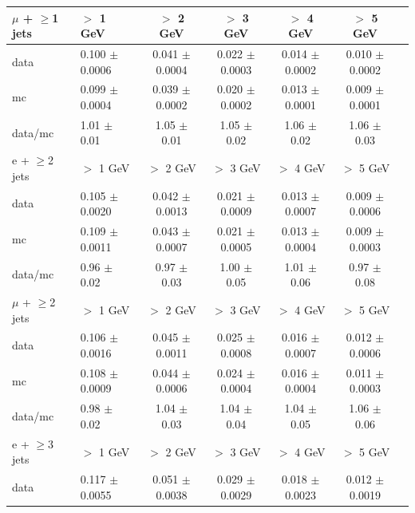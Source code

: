 \begin{table}[!ht]
\begin{center}
\begin{tabular}{l|l|c|c|c|c|c}
\hline
\hline
 $\mu$ + $\geq$1 jets            &           $>$ 1 GeV   &           $>$ 2 GeV   &           $>$ 3 GeV   &           $>$ 4 GeV   &           $>$ 5 GeV  \\
\hline
      data   &  0.100 $\pm$ 0.0006   &  0.041 $\pm$ 0.0004   &  0.022 $\pm$ 0.0003   &  0.014 $\pm$ 0.0002   &  0.010 $\pm$ 0.0002  \\
        mc   &  0.099 $\pm$ 0.0004   &  0.039 $\pm$ 0.0002   &  0.020 $\pm$ 0.0002   &  0.013 $\pm$ 0.0001   &  0.009 $\pm$ 0.0001  \\
   data/mc   &     1.01 $\pm$ 0.01   &     1.05 $\pm$ 0.01   &     1.05 $\pm$ 0.02   &     1.06 $\pm$ 0.02   &     1.06 $\pm$ 0.03  \\
\hline
\hline
 e + $\geq$2 jets            &           $>$ 1 GeV   &           $>$ 2 GeV   &           $>$ 3 GeV   &           $>$ 4 GeV   &           $>$ 5 GeV  \\
\hline
      data   &  0.105 $\pm$ 0.0020   &  0.042 $\pm$ 0.0013   &  0.021 $\pm$ 0.0009   &  0.013 $\pm$ 0.0007   &  0.009 $\pm$ 0.0006  \\
        mc   &  0.109 $\pm$ 0.0011   &  0.043 $\pm$ 0.0007   &  0.021 $\pm$ 0.0005   &  0.013 $\pm$ 0.0004   &  0.009 $\pm$ 0.0003  \\
   data/mc   &     0.96 $\pm$ 0.02   &     0.97 $\pm$ 0.03   &     1.00 $\pm$ 0.05   &     1.01 $\pm$ 0.06   &     0.97 $\pm$ 0.08  \\
\hline
\hline
 $\mu$ + $\geq$2 jets            &           $>$ 1 GeV   &           $>$ 2 GeV   &           $>$ 3 GeV   &           $>$ 4 GeV   &           $>$ 5 GeV  \\
\hline
      data   &  0.106 $\pm$ 0.0016   &  0.045 $\pm$ 0.0011   &  0.025 $\pm$ 0.0008   &  0.016 $\pm$ 0.0007   &  0.012 $\pm$ 0.0006  \\
        mc   &  0.108 $\pm$ 0.0009   &  0.044 $\pm$ 0.0006   &  0.024 $\pm$ 0.0004   &  0.016 $\pm$ 0.0004   &  0.011 $\pm$ 0.0003  \\
   data/mc   &     0.98 $\pm$ 0.02   &     1.04 $\pm$ 0.03   &     1.04 $\pm$ 0.04   &     1.04 $\pm$ 0.05   &     1.06 $\pm$ 0.06  \\
\hline
\hline
 e + $\geq$3 jets            &           $>$ 1 GeV   &           $>$ 2 GeV   &           $>$ 3 GeV   &           $>$ 4 GeV   &           $>$ 5 GeV  \\
\hline
      data   &  0.117 $\pm$ 0.0055   &  0.051 $\pm$ 0.0038   &  0.029 $\pm$ 0.0029   &  0.018 $\pm$ 0.0023   &  0.012 $\pm$ 0.0019  \\

\end{tabular}
\end{center}
\end{table}
